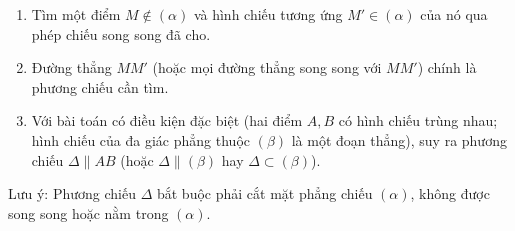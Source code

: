 \begin{enumerate}
\item Tìm một điểm $M \notin (\alpha)$ và hình chiếu tương ứng $M' \in (\alpha)$ của nó qua phép chiếu song song đã cho.
\item Đường thẳng $MM'$ (hoặc mọi đường thẳng song song với $MM'$) chính là phương chiếu cần tìm.
\item Với bài toán có điều kiện đặc biệt (hai điểm $A, B$ có hình chiếu trùng nhau; hình chiếu của đa giác phẳng thuộc $(\beta)$ là một đoạn thẳng), suy ra phương chiếu $\Delta \parallel AB$ (hoặc $\Delta \parallel (\beta)$ hay $\Delta \subset (\beta)$).
\end{enumerate}
Lưu ý: Phương chiếu $\Delta$ bắt buộc phải cắt mặt phẳng chiếu $(\alpha)$, không được song song hoặc nằm trong $(\alpha)$.
